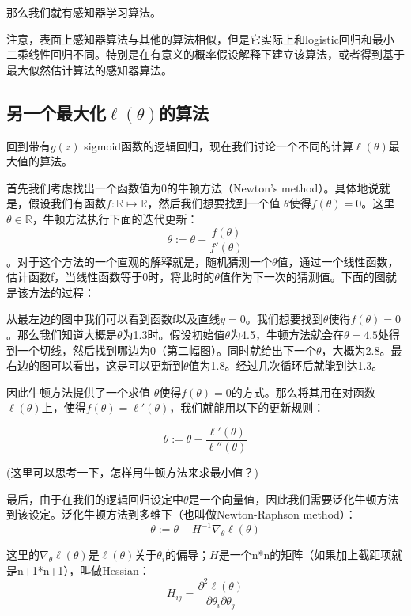 \documentclass[UTF8]{ctexart}
\begin{document}
那么我们就有感知器学习算法。

注意，表面上感知器算法与其他的算法相似，但是它实际上和logistic回归和最小二乘线性回归不同。特别是在有意义的概率假设解释下建立该算法，或者得到基于最大似然估计算法的感知器算法。


\subsection{另一个最大化$\ell(\theta)$的算法}
 
回到带有$g(z)$ sigmoid函数的逻辑回归，现在我们讨论一个不同的计算$\ell(\theta)$最大值的算法。

首先我们考虑找出一个函数值为0的牛顿方法（Newton’s method）。具体地说就是，假设我们有函数$f:\mathbb{R} \mapsto \mathbb{R}$，然后我们想要找到一个值 $\theta$使得$f(\theta)=0$。这里$\theta \in \mathbb{R}$，牛顿方法执行下面的迭代更新：\[\theta:= \theta - \frac{f(\theta)}{f'(\theta)} \]。对于这个方法的一个直观的解释就是，随机猜测一个$\theta$值，通过一个线性函数，估计函数f，当线性函数等于0时，将此时的$\theta$值作为下一次的猜测值。下面的图就是该方法的过程：

\begin{figure}[htb]        
\end{figure}

从最左边的图中我们可以看到函数f以及直线$y=0$。我们想要找到$\theta$使得$f(\theta)=0$。那么我们知道大概是$\theta$为1.3时。假设初始值$\theta$为4.5，牛顿方法就会在$\theta=4.5$处得到一个切线，然后找到哪边为0（第二幅图）。同时就给出下一个$\theta$，大概为2.8。最右边的图可以看出，这是可以更新到$\theta$值为1.8。经过几次循环后就能到达1.3。

因此牛顿方法提供了一个求值 $\theta$使得$f(\theta)=0$的方式。那么将其用在对函数$\ell(\theta)$上，使得$f(\theta)=\ell '(\theta)$，我们就能用以下的更新规则：

\[\theta:= \theta - \frac{\ell '(\theta)}{\ell ''(\theta)} \]


(这里可以思考一下，怎样用牛顿方法来求最小值？)

最后，由于在我们的逻辑回归设定中$\theta$是一个向量值，因此我们需要泛化牛顿方法到该设定。泛化牛顿方法到多维下（也叫做Newton-Raphson method）：
\[\theta := \theta - H^{-1} \nabla_{\theta}\ell(\theta) \]

这里的$ \nabla_{\theta}\ell(\theta)$是$\ell(\theta)$关于$\theta_{i}$的偏导；$H$是一个n*n的矩阵（如果加上截距项就是n+1*n+1），叫做Hessian：\[ H_{ij} = \frac{\partial^{2}\ell(\theta)}{\partial \theta_{i} \partial \theta_{j}}\]
\end{document}
